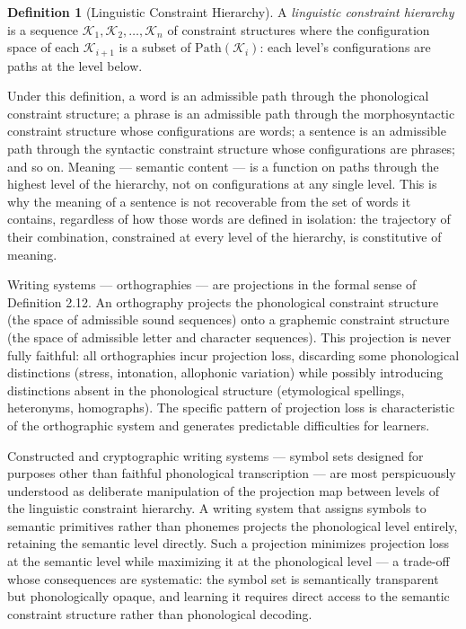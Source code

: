 \documentclass[12pt, twoside]{article}
\theoremstyle{plain}
\theoremstyle{definition}
\newtheorem{definition}[theorem]{Definition}
\theoremstyle{remark}
\begin{document}
\begin{definition}[Linguistic Constraint Hierarchy]
A \emph{linguistic constraint hierarchy} is a sequence
$\mathcal{K}_1, \mathcal{K}_2, \ldots, \mathcal{K}_n$ of constraint
structures where the configuration space of each $\mathcal{K}_{i+1}$
is a subset of $\mathrm{Path}(\mathcal{K}_i)$:
each level's configurations are paths at the level below.
\end{definition}

Under this definition, a word is an admissible path through the
phonological constraint structure; a phrase is an admissible path
through the morphosyntactic constraint structure whose configurations
are words; a sentence is an admissible path through the syntactic
constraint structure whose configurations are phrases; and so on.
Meaning — semantic content — is a function on paths through the highest
level of the hierarchy, not on configurations at any single level.
This is why the meaning of a sentence is not recoverable from
the set of words it contains, regardless of how those words are
defined in isolation: the trajectory of their combination,
constrained at every level of the hierarchy, is constitutive of meaning.

Writing systems — orthographies — are projections in the formal sense
of Definition 2.12.
An orthography projects the phonological constraint structure
(the space of admissible sound sequences) onto a graphemic constraint
structure (the space of admissible letter and character sequences).
This projection is never fully faithful: all orthographies incur
projection loss, discarding some phonological distinctions
(stress, intonation, allophonic variation) while possibly introducing
distinctions absent in the phonological structure (etymological spellings,
heteronyms, homographs).
The specific pattern of projection loss is characteristic of the
orthographic system and generates predictable difficulties for learners.

Constructed and cryptographic writing systems — symbol sets designed
for purposes other than faithful phonological transcription —
are most perspicuously understood as deliberate manipulation of
the projection map between levels of the linguistic constraint hierarchy.
A writing system that assigns symbols to semantic primitives rather than
phonemes projects the phonological level entirely, retaining the
semantic level directly.
Such a projection minimizes projection loss at the semantic level
while maximizing it at the phonological level — a trade-off whose
consequences are systematic: the symbol set is semantically transparent
but phonologically opaque, and learning it requires direct access
to the semantic constraint structure rather than phonological decoding.
\end{document}
